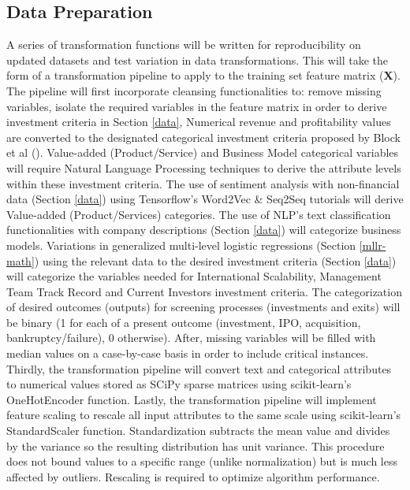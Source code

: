 \documentclass[12pt]{article}
\begin{document}
\subsection{Data Preparation}\label{data-prep}
A series of transformation functions will be written for reproducibility on updated datasets and test variation in data transformations.
This will take the form of a transformation pipeline to apply to the training set feature matrix (\textbf{X}).
The pipeline will first incorporate cleansing functionalities to: remove missing variables, 
isolate the required variables in the feature matrix in order to derive investment criteria in Section \ref{data},
Numerical revenue and profitability values are converted to the designated categorical investment criteria proposed by Block et al (\citeyear{BLOCK2019329}).
Value-added (Product/Service) and Business Model categorical variables will require Natural Language Processing techniques to derive the attribute levels within these investment criteria.
The use of sentiment analysis with non-financial data (Section \ref{data}) using Tensorflow's Word2Vec \& Seq2Seq tutorials will derive Value-added (Product/Services) categories.
The use of NLP's text classification functionalities with company descriptions (Section \ref{data}) will categorize business models.
Variations in generalized multi-level logistic regressions (Section \ref{mllr-math}) using the relevant data to the desired investment criteria (Section \ref{data}) will categorize the variables needed for International Scalability, Management Team Track Record and Current Investors investment criteria.
The categorization of desired outcomes (outputs) for screening processes (investments and exits) will be binary (1 for each of a present outcome (investment, IPO, acquisition,  bankruptcy/failure), 0 otherwise). 
After, missing variables will be filled with median values on a case-by-case basis in order to include critical instances.
Thirdly, the transformation pipeline will convert text and categorical attributes to numerical values stored as SCiPy sparse matrices using scikit-learn's OneHotEncoder function.
Lastly, the transformation pipeline will implement feature scaling to rescale all input attributes to the same scale using scikit-learn's StandardScaler function.
Standardization subtracts the mean value and divides by the variance so the resulting distribution has unit variance.
This procedure does not bound values to a specific range (unlike normalization) but is much less affected by outliers.
Rescaling is required to optimize algorithm performance.
\end{document}
